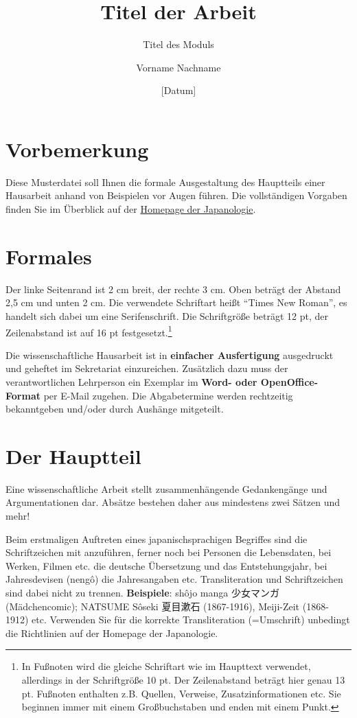 \documentclass{japuzk}
\title{Titel der Arbeit}
\subtitle{Titel des Moduls}
\date{[Datum]}
\author{Vorname Nachname}
\begin{document}
\maketitle
\tableofcontents

\section{Vorbemerkung}
Diese Musterdatei soll Ihnen die formale Ausgestaltung des Hauptteils einer Hausarbeit anhand von Beispielen vor Augen führen. Die vollständigen Vorgaben finden Sie im Überblick auf der \href{\japfacultyhomepage}{Homepage der Japanologie}.

\section{Formales}
Der linke Seitenrand ist 2 cm breit, der rechte 3 cm. Oben beträgt der Abstand 2,5 cm und unten 2 cm. Die verwendete Schriftart heißt \enquote{Times New Roman}, es handelt sich dabei um eine Serifenschrift. Die Schriftgröße beträgt 12 pt, der Zeilenabstand ist auf 16 pt festgesetzt.\footnote{In Fußnoten wird die gleiche Schriftart wie im Haupttext verwendet, allerdings in der Schriftgröße 10 pt. Der Zeilenabstand beträgt hier genau 13 pt. Fußnoten enthalten z.B. Quellen, Verweise, Zusatzinformationen etc. Sie beginnen immer mit einem Großbuchstaben und enden mit einem Punkt.}

Die wissenschaftliche Hausarbeit ist in \textbf{einfacher Ausfertigung} ausgedruckt und geheftet im Sekretariat einzureichen. Zusätzlich dazu muss der verantwortlichen Lehrperson ein Exemplar im \textbf{Word- oder OpenOffice-Format} per E-Mail zugehen. Die Abgabetermine werden rechtzeitig bekanntgeben und/oder durch Aushänge mitgeteilt.

\section{Der Hauptteil}
Eine wissenschaftliche Arbeit stellt zusammenhängende Gedankengänge und Argumentationen dar. Absätze bestehen daher aus mindestens zwei Sätzen und mehr!

Beim erstmaligen Auftreten eines japanischsprachigen Begriffes sind die Schriftzeichen mit anzuführen, ferner noch bei Personen die Lebensdaten, bei Werken, Filmen etc. die deutsche Übersetzung und das Entstehungsjahr, bei Jahresdevisen (nengô) die Jahresangaben etc. Transliteration und Schriftzeichen sind dabei nicht zu trennen.\newline
\textbf{Beispiele}: shôjo manga 少女マンガ (Mädchencomic); NATSUME Sôseki 夏目漱石 (1867-1916), Meiji-Zeit (1868-1912) etc.\newline
Verwenden Sie für die korrekte Transliteration (=Umschrift) unbedingt die Richtlinien auf der Homepage der Japanologie.
\end{document}
